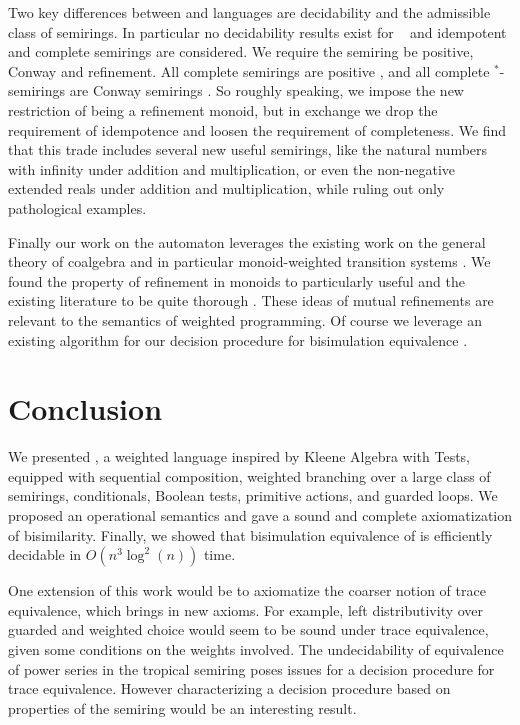 \documentclass[a4paper,UKenglish,cleveref, autoref, thm-restate]{lipics-v2021}
\newcommand{\wgkat}{\textsf{\upshape{wGKAT}}\xspace}
\newcommand{\kawt}{\textsf{\upshape{KAWT}}\xspace}
\theoremstyle{plain}\newtheoremrep{thm}{Theorem}[section]
\begin{document}
	Two key differences between \wgkat and \kawt languages are decidability and the admissible class of semirings. In particular no decidability results exist for \kawt~\cite{sedlar2023kleenealgebratestsweighted} and idempotent and complete semirings are considered. We require the semiring be positive, Conway and refinement. All complete semirings are positive \cite[22.28]{golan2013semirings}, and all complete $^*$-semirings are Conway semirings \cite[Theorem 3.4]{weightedhandbook}. So roughly speaking, we impose the new restriction of being a refinement monoid, but in exchange we drop the requirement of idempotence and loosen the requirement of completeness. We find that this trade includes several new useful semirings, like the natural numbers with infinity under addition and multiplication, or even the non-negative extended reals under addition and multiplication, while ruling out only pathological examples.
	
	Finally our work on the \wgkat automaton leverages the existing work on the general theory of coalgebra \cite{Rutten2000UniversalCA, gumm2002coalgebras, PETERGUMM2000111, gumm2009copower} and in particular monoid-weighted transition systems \cite{GUMM2001185}. We found the property of refinement in monoids to particularly useful and the existing literature to be quite thorough \cite{refinementmonoids, GUMM2001185}. These ideas of mutual refinements are relevant to the semantics of weighted programming. Of course we leverage an existing algorithm for our decision procedure for bisimulation equivalence \cite{10.1007/978-3-030-30942-8_18, wissmann2020efficient, dorsch2017efficientcoalgebraicpartitionrefinement}.
	\section{Conclusion}\label{conclS}
	We presented \wgkat, a weighted language inspired by Kleene Algebra with Tests, equipped with sequential composition, weighted branching over a large class of semirings, conditionals, Boolean tests, primitive actions, and guarded loops. We proposed an operational semantics and gave a sound and complete axiomatization of bisimilarity. Finally, we showed that bisimulation equivalence of \wgkat is efficiently decidable in $O(n^3\log^2(n))$ time. 
	
	One extension of this work would be to axiomatize the coarser notion of trace equivalence, which brings in new axioms. For example, left distributivity over guarded and weighted choice would seem to be sound under trace equivalence, given some conditions on the weights involved. The undecidability of equivalence of power series in the tropical semiring poses issues for a decision procedure for trace equivalence. However characterizing a decision procedure based on properties of the semiring would be an interesting result. 
		
\end{document}
